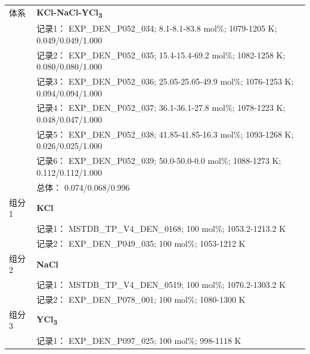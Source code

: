 \documentclass[12pt]{article}
\begin{document}
{\begin{longtable}[]{@{}
  >{\raggedright\arraybackslash}p{}
  >{\raggedright\arraybackslash}p{}@{}}
\midrule
体系 & \textbf{KCl-NaCl-YCl\textsubscript{3}} \\
 & 记录1： EXP\_DEN\_P052\_034; 8.1-8.1-83.8 mol\%; 1079-1205 K; 0.049/0.049/1.000 \\
 & 记录2： EXP\_DEN\_P052\_035; 15.4-15.4-69.2 mol\%; 1082-1258 K; 0.080/0.080/1.000 \\
 & 记录3： EXP\_DEN\_P052\_036; 25.05-25.05-49.9 mol\%; 1076-1253 K; 0.094/0.094/1.000 \\
 & 记录4： EXP\_DEN\_P052\_037; 36.1-36.1-27.8 mol\%; 1078-1223 K; 0.048/0.047/1.000 \\
 & 记录5： EXP\_DEN\_P052\_038; 41.85-41.85-16.3 mol\%; 1093-1268 K; 0.026/0.025/1.000 \\
 & 记录6： EXP\_DEN\_P052\_039; 50.0-50.0-0.0 mol\%; 1088-1273 K; 0.112/0.112/1.000 \\
 & 总体： 0.074/0.068/0.996  \\

组分 1  & \textbf{KCl} \\
 & 记录1： MSTDB\_TP\_V4\_DEN\_0168; 100 mol\%; 1053.2-1213.2 K \\
 & 记录2： EXP\_DEN\_P049\_035; 100 mol\%; 1053-1212 K  \\

组分 2  & \textbf{NaCl} \\
 & 记录1： MSTDB\_TP\_V4\_DEN\_0519; 100 mol\%; 1076.2-1303.2 K \\
 & 记录2： EXP\_DEN\_P078\_001; 100 mol\%; 1080-1300 K  \\

组分 3  & \textbf{YCl\textsubscript{3}} \\
 & 记录1： EXP\_DEN\_P097\_025; 100 mol\%; 998-1118 K  \\


\end{longtable}}
\end{document}

